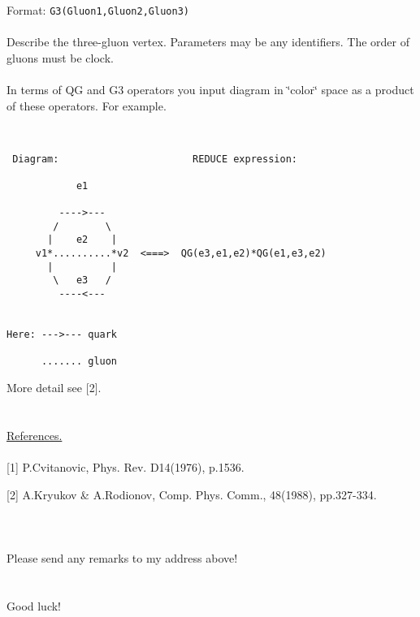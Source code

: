 \documentclass{article}
\begin{document}
Format: {\tt G3(Gluon1,Gluon2,Gluon3)} \\
\ \\
Describe the three-gluon vertex. Parameters may be any identifiers.
The order of gluons must be clock. \\
\ \\
In terms of QG and G3 operators you input diagram in \char`\"{}color\char`\"{}
space as a product of these operators. For example. 

\begin{verbatim}


 Diagram:                       REDUCE expression:

            e1

         ---->---
        /        \
       |    e2    |
     v1*..........*v2  <===>  QG(e3,e1,e2)*QG(e1,e3,e2)
       |          |
        \   e3   /
         ----<---


Here: --->--- quark

      ....... gluon

\end{verbatim}

More detail see {[}2{]}. \\
\ \\
\ \\
\underline{References.} \\ 
\ \\
{[}1{]} P.Cvitanovic, Phys. Rev. D14(1976), p.1536.

{[}2{]} A.Kryukov \& A.Rodionov, Comp. Phys. Comm., 48(1988), pp.327-334.\\
\ \\
\ \\
\ \\
Please send any remarks to my address above! \\
\ \\
\ \\
Good luck!
\end{document}
